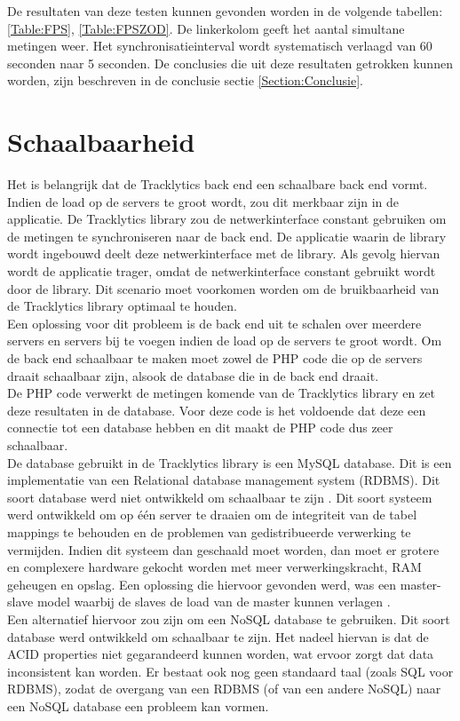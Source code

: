 De resultaten van deze testen kunnen gevonden worden in de volgende tabellen: \ref{Table:FPS}, \ref{Table:FPSZOD}. De linkerkolom geeft het aantal simultane metingen weer. Het synchronisatieinterval wordt systematisch verlaagd van 60 seconden naar 5 seconden. De conclusies die uit deze resultaten getrokken kunnen worden, zijn beschreven in de conclusie sectie \ref{Section:Conclusie}.




\section{Schaalbaarheid}
Het is belangrijk dat de Tracklytics back end een schaalbare back end vormt. Indien de load op de servers te groot wordt, zou dit merkbaar zijn in de applicatie. De Tracklytics library zou de netwerkinterface constant gebruiken om de metingen te synchroniseren naar de back end. De applicatie waarin de library wordt ingebouwd deelt deze netwerkinterface met de library. Als gevolg hiervan wordt de applicatie trager, omdat de netwerkinterface constant gebruikt wordt door de library. Dit scenario moet voorkomen worden om de bruikbaarheid van de Tracklytics library optimaal te houden.\\

Een oplossing voor dit probleem is de back end uit te schalen over meerdere servers en servers bij te voegen indien de load op de servers te groot wordt. Om de back end schaalbaar te maken moet zowel de PHP code die op de servers draait schaalbaar zijn, alsook de database die in de back end draait. \\

De PHP code verwerkt de metingen komende van de Tracklytics library en zet deze resultaten in de database. Voor deze code is het voldoende dat deze een connectie tot een database hebben en dit maakt de PHP code dus zeer schaalbaar.\\

De database gebruikt in de Tracklytics library is een MySQL database. Dit is een implementatie van een Relational database management system (RDBMS). Dit soort database werd niet ontwikkeld om schaalbaar te zijn \cite{RDBMS}. Dit soort systeem werd ontwikkeld om op \'e\'en server te draaien om de integriteit van de tabel mappings te behouden en de problemen van gedistribueerde verwerking te vermijden. Indien dit systeem dan geschaald moet worden, dan moet er grotere en complexere hardware gekocht worden met meer verwerkingskracht, RAM geheugen en opslag. Een oplossing die hiervoor gevonden werd, was een master-slave model waarbij de slaves de load van de master kunnen verlagen \cite{MasterSlave}. \\
Een alternatief hiervoor zou zijn om een NoSQL database te gebruiken. Dit soort database werd ontwikkeld om schaalbaar te zijn. Het nadeel hiervan is dat de ACID properties niet gegarandeerd kunnen worden, wat ervoor zorgt dat data inconsistent kan worden. Er bestaat ook nog geen standaard taal (zoals SQL voor RDBMS), zodat de overgang van een RDBMS (of van een andere NoSQL) naar een NoSQL database een probleem kan vormen. \\


